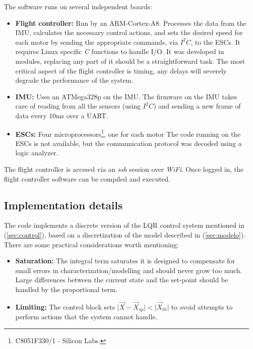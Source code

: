 \documentclass[conference]{IEEEtran}
\newcommand{\refp}[1]{(\ref{#1})}
\begin{document}
The software runs on several independent boards:

\begin{itemize}
\item \textbf{Flight controller:} Run by an ARM-Cortex-A8. Processes the data from the IMU, calculates the necessary control actions, and sets the desired speed for each motor by sending the appropriate commands, via $I^2C$, to the ESCs. It requires Linux specific \textit{C} functions to handle I/O. It was developed in modules, replacing any part of it should be a straightforward task. The most critical aspect of the flight controller is timing, any delays will severely degrade the performance of the system.
\item \textbf{IMU:} Uses an ATMega328p on the IMU. The firmware on the IMU takes care of reading from all the sensors (using $I^2C$) and sending a new frame of data every 10ms over a UART.
\item \textbf{ESCs:} Four microprocessors\footnote{C8051F330/1 - Silicon Labs.}, one for each motor The code running on the ESCs is not available, but the communication protocol was decoded using a logic analyzer.
\end{itemize}

The flight controller is accesed via an \textit{ssh} session over \textit{WiFi}. Once logged in, the flight controller software can be compiled and executed.

\subsection{Implementation details}
\label{sec:software-impl}

The code implements a discrete version of the LQR control system mentioned in \refp{sec:control}, based on a discretization of the model described in \refp{sec:modelo}. There are some practical considerations worth mentioning:
\begin{itemize}
\item \textbf{Saturation:} The integral term saturates it is designed to compensate for small errors in characterization/modelling and should never grow too much. Large differences between the current state and the set-point should be handled by the proportional term.
\item \textbf{Limiting:} The control block sets $\vert \vec{X} - \vec{X}_{sp}\vert < \vert \vec{X}_{th} \vert$ to avoid attempts to perform actions that the system cannot handle.
\end{itemize}
\end{document}
